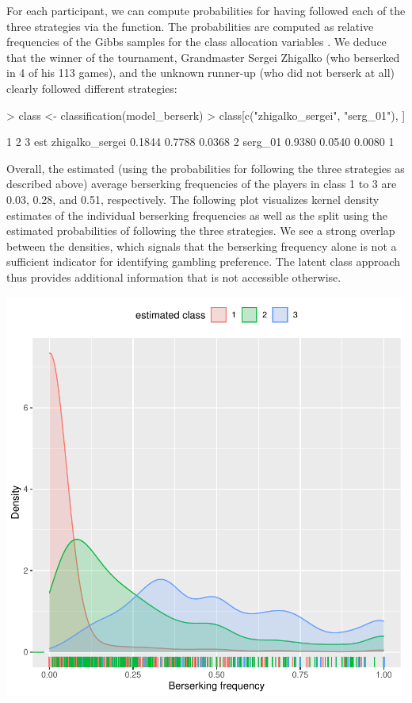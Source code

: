 \documentclass[article,shortnames]{jss}
\newcommand{\fct}[1]{\code{#1()}}
\begin{document}
\newpage

For each participant, we can compute probabilities for having followed each of the three strategies via the \fct{classification} function. The probabilities are computed as relative frequencies of the Gibbs samples for the class allocation variables . We deduce that the winner of the tournament, Grandmaster Sergei Zhigalko (who berserked in 4 of his 113 games), and the unknown runner-up (who did not berserk at all) clearly followed different strategies:

\begin{Schunk}
\begin{Sinput}
> class <- classification(model_berserk)
> class[c("zhigalko_sergei", "serg_01"), ]
\end{Sinput}
\begin{Soutput}
                     1      2      3 est
zhigalko_sergei 0.1844 0.7788 0.0368   2
serg_01         0.9380 0.0540 0.0080   1
\end{Soutput}
\end{Schunk}

Overall, the estimated (using the probabilities for following the three strategies as described above) average berserking frequencies of the players in class 1 to 3 are 0.03, 0.28, and
0.51, respectively. The following plot visualizes kernel density estimates of the individual
berserking frequencies as well as the split using the estimated probabilities of following the three strategies. We see a strong overlap between the densities, which signals that the berserking frequency alone is not a sufficient indicator for identifying gambling preference. The latent class approach thus provides additional information that is not accessible otherwise.

\includegraphics{rprobitb_oelschlaeger_bauer-berserk-freq}
\end{document}
